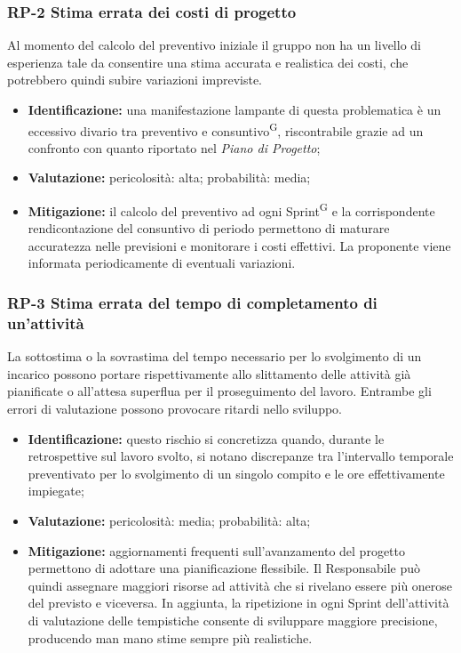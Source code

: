 \documentclass[8pt]{article}
\newcommand{\glossterm}[1]{#1\textsuperscript{G}} %
\begin{document}
\subsubsection{RP-2 Stima errata dei costi di progetto}
Al momento del calcolo del preventivo iniziale il gruppo non ha un livello di esperienza tale da consentire una stima accurata e realistica dei costi, che potrebbero quindi subire variazioni impreviste.
\begin{itemize}
\setlength\itemsep{0em}
    \item \textbf{Identificazione:} una manifestazione lampante di questa problematica è un eccessivo divario tra preventivo e \glossterm{consuntivo}, riscontrabile grazie ad un confronto con quanto riportato nel \textit{Piano di Progetto};
    \item \textbf{Valutazione:} pericolosità: alta; probabilità: media;
    \item \textbf{Mitigazione:} il calcolo del preventivo ad ogni \glossterm{Sprint} e la corrispondente rendicontazione del consuntivo di periodo permettono di maturare accuratezza nelle previsioni e monitorare i costi effettivi. La proponente viene informata periodicamente di eventuali variazioni.
\end{itemize}

\subsubsection{RP-3 Stima errata del tempo di completamento di un'attività}
La sottostima o la sovrastima del tempo necessario per lo svolgimento di un incarico possono portare rispettivamente allo slittamento delle attività già pianificate o all'attesa superflua per il proseguimento del lavoro. Entrambe gli errori di valutazione possono provocare ritardi nello sviluppo.
\begin{itemize}
\setlength\itemsep{0em}
    \item \textbf{Identificazione:} questo rischio si concretizza quando, durante le retrospettive sul lavoro svolto, si notano discrepanze tra l'intervallo temporale preventivato per lo svolgimento di un singolo compito e le ore effettivamente impiegate;
    \item \textbf{Valutazione:} pericolosità: media; probabilità: alta;
    \item \textbf{Mitigazione:} aggiornamenti frequenti sull'avanzamento del progetto permettono di adottare una pianificazione flessibile. Il Responsabile può quindi assegnare maggiori risorse ad attività che si rivelano essere più onerose del previsto e viceversa. In aggiunta, la ripetizione in ogni Sprint dell'attività di valutazione delle tempistiche consente di sviluppare maggiore precisione, producendo man mano stime sempre più realistiche.
\end{itemize}
\end{document}

